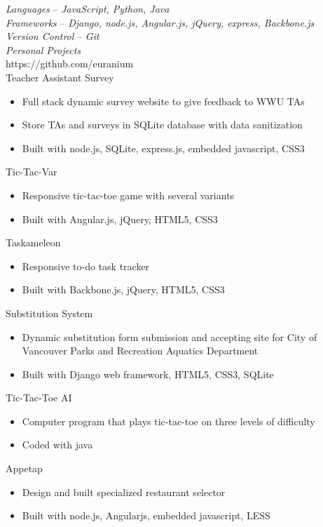 \documentclass[line,margin]{res}
\begin{document}
\begin{resume}
	{\sl Languages} -- {\sl JavaScript, Python, Java}\\
	{\sl Frameworks} -- {\sl Django, node.js, Angular.js, jQuery, express, Backbone.js} \\
	{\sl Version Control} -- {\sl Git}\\
	{\sl Personal Projects}\\
	{\footnotesize https://github.com/euranium}\\
	Teacher Assistant Survey
	\begin{itemize} \itemsep -2pt
		\item Full stack dynamic survey website to give feedback to WWU TAs
		\item Store TAs and surveys in SQLite database with data sanitization
		\item Built with node.js, SQLite, express.js, embedded javascript, CSS3
	\end{itemize}
	Tic-Tac-Var
	\begin{itemize} \itemsep -2pt
		\item Responsive tic-tac-toe game with several variants
		\item Built with Angular.js, jQuery, HTML5, CSS3
	\end{itemize}
	Taskameleon
	\begin{itemize} \itemsep -2pt
		\item Responsive to-do task tracker
		\item Built with Backbone.js, jQuery, HTML5, CSS3 
	\end{itemize}
	Substitution System
	\begin{itemize} \itemsep -2pt
		\item Dynamic substitution form submission and accepting site for City of Vancouver Parks and Recreation Aquatics Department
		\item Built with Django web framework, HTML5, CSS3, SQLite
	\end{itemize}
	Tic-Tac-Toe AI
	\begin{itemize} \itemsep -2pt
		\item Computer program that plays tic-tac-toe on three levels of difficulty
		\item Coded with java
	\end{itemize}
	Appetap
	\begin{itemize} \itemsep -2pt
		\item Design and built specialized restaurant selector 
		\item Built with node.js, Angularjs, embedded javascript, LESS
	\end{itemize}


\end{resume}
\end{document}
